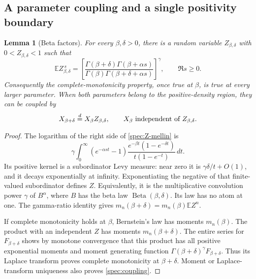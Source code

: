 \documentclass[11pt,a4paper]{article}
\newtheorem{lemma}[theorem]{Lemma}
\theoremstyle{definition}
\theoremstyle{remark}
\numberwithin{equation}{section}
\begin{document}
\subsection{A parameter coupling and a single positivity boundary}

\begin{lemma}[Beta factors]\label{spec:beta-factor}
For every \(\beta,\delta>0\), there is a random variable
\(Z_{\beta,\delta}\) with \(0<Z_{\beta,\delta}<1\) such that
\begin{equation}\label{spec:Z-mellin}
 \mathbb E Z_{\beta,\delta}^{\,s}
 =\left[
   \frac{\Gamma(\beta+\delta)\Gamma(\beta+\alpha s)}
        {\Gamma(\beta)\Gamma(\beta+\delta+\alpha s)}
   \right]^\gamma,\qquad \Re s\ge0.
\end{equation}
Consequently the complete-monotonicity property, once true at \(\beta\),
is true at every larger parameter.  When both parameters belong to
the positive-density region, they can be coupled by
\begin{equation}\label{spec:coupling}
 X_{\beta+\delta}\overset{d}=X_\beta Z_{\beta,\delta},
 \qquad X_\beta\ \hbox{independent of }Z_{\beta,\delta}.
\end{equation}
\end{lemma}

\begin{proof}
The logarithm of the right side of \eqref{spec:Z-mellin} is
\[
 \gamma\int_0^\infty (e^{-\alpha st}-1)
 \frac{e^{-\beta t}(1-e^{-\delta t})}{t(1-e^{-t})}\,dt.
\]
Its positive kernel is a subordinator Levy measure: near zero it is
\(\gamma\delta/t+O(1)\), and it decays exponentially at infinity.
Exponentiating the negative of that finite-valued subordinator defines
\(Z\).  Equivalently, it is the multiplicative convolution power
\(\gamma\) of \(B^\alpha\), where \(B\) has the beta law
\(\operatorname{Beta}(\beta,\delta)\).  Its law has no atom at one.
The gamma-ratio identity gives
\(m_n(\beta+\delta)=m_n(\beta)\mathbb E Z^n\).

If complete monotonicity holds at \(\beta\), Bernstein's law has
moments \(m_n(\beta)\).  The product with an independent \(Z\) has
moments \(m_n(\beta+\delta)\).  The entire series for \(F_{\beta+\delta}\)
shows by monotone convergence that this product has all positive
exponential moments and moment generating function
\(\Gamma(\beta+\delta)^\gamma F_{\beta+\delta}\).  Thus its Laplace
transform proves complete monotonicity at \(\beta+\delta\).
Moment or Laplace-transform uniqueness also proves \eqref{spec:coupling}.
\end{proof}
\end{document}
